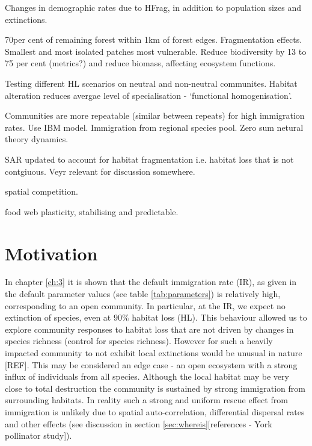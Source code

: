 \begin{itemize}
\cite{korfanta2012long} Changes in demographic rates due to HFrag, in addition to population sizes and extinctions.

\cite{haddad2015habitat} 70per cent of remaining forest within 1km of forest edges. Fragmentation effects. Smallest and most isolated patches most vulnerable. Reduce biodiversity by 13 to 75 per cent (metrics?) and reduce biomass, affecting ecosystem functions. 

\cite{teyssedre2014contrasting} Testing different HL scenarios on neutral and non-neutral communites. Habitat alteration reduces avergae level of specialisation - `functional homogenisation'.

\cite{ai2012immigration} Communities are more repeatable (similar between repeats) for high immigration rates. Use IBM model. Immigration from regional species pool. Zero sum netural theory dynamics. 

\cite{hanski2013species} SAR updated to account for habitat fragmentation i.e. habitat loss that is not contgiuous. Veyr relevant for discussion somewhere.

\cite{freckleton2009measuring} spatial competition.

\cite{eveleigh2007fluctuations} food web plasticity, stabilising and predictable.

\section{Motivation}
\label{sec:motivate_immigration}

In chapter \ref{ch:3} it is shown that the default immigration rate (IR), as given in the default parameter values (see table \ref{tab:parameters}) is relatively high, corresponding to an open community. In particular, at the IR, we expect no extinction of species, even at $90\%$ habitat loss (HL). This behaviour allowed us to explore community responses to habitat loss that are not driven by changes in species richness (control for species richness). However for such a heavily impacted community to not exhibit local extinctions would be unusual in nature [REF]. This may be considered an edge case - an open ecosystem with a strong influx of individuals from all species. Although the local habitat may be very close to total destruction the community is sustained by strong immigration from surrounding habitats. In reality such a strong and uniform rescue effect from immigration is unlikely due to spatial auto-correlation, differential dispersal rates and other effects (see discussion in section \ref{sec:whereis}[references - York pollinator study]).


\end{itemize}
